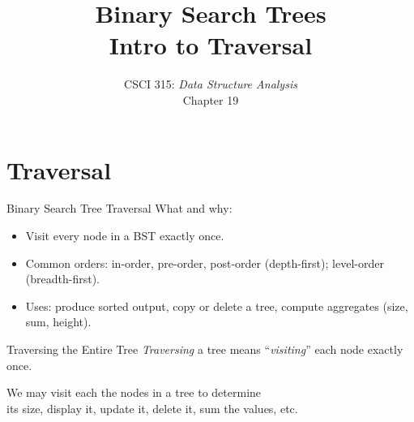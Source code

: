 \documentclass[14pt,aspectratio=1610]{beamer}
\title{\Huge{} Binary Search Trees\\Intro to Traversal}
\subtitle{CSCI 315: \textit{Data Structure Analysis}\\Chapter 19}
\institute{Charleston Southern University}
\begin{document}
\begin{frame}
  \titlepage{}
\end{frame}

\section*{Traversal}

\begin{frame}{Binary Search Tree Traversal}
  What and why:
  \begin{itemize}
    \item Visit every node in a BST exactly once.
    \item Common orders: in-order, pre-order, post-order (depth-first); level-order (breadth-first).
    \item Uses: produce sorted output, copy or delete a tree, compute aggregates (size, sum, height).
  \end{itemize}
\end{frame}

\begin{frame}{Traversing the Entire Tree}
  \emph{Traversing} a tree means ``\emph{visiting}'' each node exactly once.
  
  We may {visit} each the nodes in a tree to determine \\
  its size, display it, update it, delete it, sum the values, etc.
\end{frame}
\end{document}
